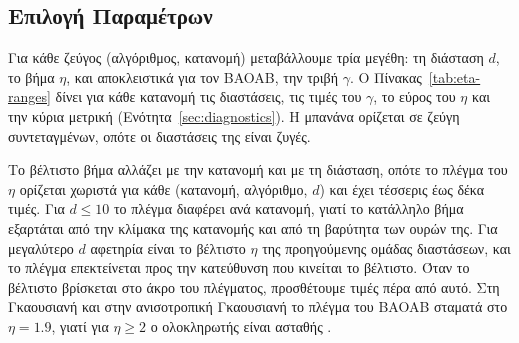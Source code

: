 \subsection{Επιλογή Παραμέτρων}

Για κάθε ζεύγος (αλγόριθμος, κατανομή) μεταβάλλουμε τρία μεγέθη: τη διάσταση
$d$, το βήμα $\eta$, και αποκλειστικά για τον BAOAB, την τριβή $\gamma$. Ο
Πίνακας~\ref{tab:eta-ranges} δίνει για κάθε κατανομή τις διαστάσεις, τις τιμές του
$\gamma$, το εύρος του $\eta$ και την κύρια μετρική (Ενότητα~\ref{sec:diagnostics}).
Η μπανάνα ορίζεται σε ζεύγη συντεταγμένων, οπότε οι διαστάσεις της είναι ζυγές.

Το βέλτιστο βήμα αλλάζει με την κατανομή και με τη διάσταση, οπότε το πλέγμα του
$\eta$ ορίζεται χωριστά για κάθε (κατανομή, αλγόριθμο, $d$) και έχει τέσσερις έως
δέκα τιμές. Για $d \le 10$ το πλέγμα διαφέρει ανά κατανομή, γιατί το κατάλληλο βήμα
εξαρτάται από την κλίμακα της κατανομής και από τη βαρύτητα των ουρών της. Για μεγαλύτερο $d$ αφετηρία είναι το βέλτιστο $\eta$
της προηγούμενης ομάδας διαστάσεων, και το πλέγμα επεκτείνεται προς την κατεύθυνση
που κινείται το βέλτιστο. Όταν το βέλτιστο βρίσκεται στο άκρο του πλέγματος,
προσθέτουμε τιμές πέρα από αυτό. Στη Γκαουσιανή και στην ανισοτροπική Γκαουσιανή
το πλέγμα του BAOAB σταματά στο $\eta = 1.9$, γιατί για $\eta \ge 2$ ο ολοκληρωτής
είναι ασταθής \citep{leimkuhler2013bao}.

